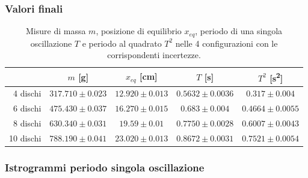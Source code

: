 \documentclass[titlepage]{article}
\numberwithin{equation}{section}
\numberwithin{figure}{section}
\numberwithin{table}{section}
\begin{document}
\subsubsection{Valori finali}

\begin{table}[ht]
  \centering
  \begin{tabular}{rcccc}
    \toprule
    & $m$ [\si{\gram}] & $x_{eq}$ [\si{\centi\metre}] & $T$ [\si{\second}] & $T^2$ [\si{\second\squared}] \\
    \midrule
    4 dischi  & $317.710 \pm 0.023$ & $12.920 \pm 0.013$ & $0.5632 \pm 0.0036$ & $0.317  \pm  0.004$ \\
    6 dischi  & $475.430 \pm 0.037$ & $16.270 \pm 0.015$ & $0.683  \pm  0.004$ & $0.4664 \pm 0.0055$ \\
    8 dischi  & $630.340 \pm 0.031$ & $19.59  \pm  0.01$ & $0.7750 \pm 0.0028$ & $0.6007 \pm 0.0043$ \\
    10 dischi & $788.190 \pm 0.041$ & $23.020 \pm 0.013$ & $0.8672 \pm 0.0031$ & $0.7521 \pm 0.0054$ \\
    \bottomrule
  \end{tabular}
  \caption{Misure di massa $m$, posizione di equilibrio $x_{eq}$, periodo di una singola oscillazione $T$ e periodo al quadrato $T^2$ nelle 4 configurazioni con le corrispondenti incertezze.}
\end{table}

\pagebreak
\subsubsection{Istrogrammi periodo singola oscillazione}
\end{document}
